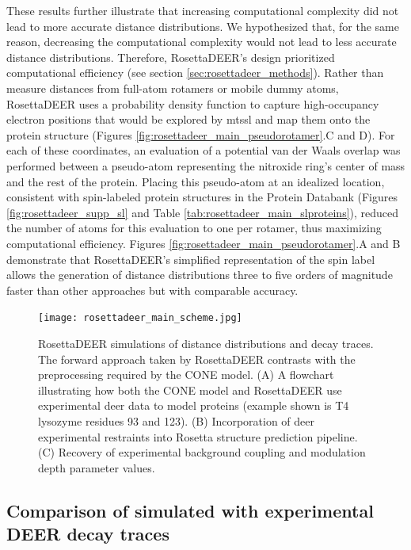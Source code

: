 These results further illustrate that increasing computational complexity did not lead to more accurate distance distributions. We hypothesized that, for the same reason, decreasing the computational complexity would not lead to less accurate distance distributions. Therefore, RosettaDEER’s design prioritized computational efficiency (see section \ref{sec:rosettadeer_methods}). Rather than measure distances from full-atom rotamers or mobile dummy atoms, RosettaDEER uses a probability density function to capture high-occupancy electron positions that would be explored by \gls{mtssl} and map them onto the protein structure (Figures \ref{fig:rosettadeer_main_pseudorotamer}.C and D). For each of these coordinates, an evaluation of a potential van der Waals overlap was performed between a pseudo-atom representing the nitroxide ring’s center of mass and the rest of the protein. Placing this pseudo-atom at an idealized location, consistent with spin-labeled protein structures in the Protein Databank (Figures \ref{fig:rosettadeer_supp_sl} and Table \ref{tab:rosettadeer_main_slproteins}), reduced the number of atoms for this evaluation to one per rotamer, thus maximizing computational efficiency. Figures \ref{fig:rosettadeer_main_pseudorotamer}.A and B demonstrate that RosettaDEER’s simplified representation of the spin label allows the generation of distance distributions three to five orders of magnitude faster than other approaches but with comparable accuracy.

\begin{figure}[h!]
\centering
\texttt{[image: rosettadeer\_main\_scheme.jpg]}
 \caption[RosettaDEER simulations of distance distributions and decay traces.]{RosettaDEER simulations of distance distributions and decay traces. The forward approach taken by RosettaDEER contrasts with the preprocessing required by the CONE model. (A) A flowchart illustrating how both the CONE model and RosettaDEER use experimental \gls{deer} data to model proteins (example shown is T4 lysozyme residues 93 and 123). (B) Incorporation of \gls{deer} experimental restraints into Rosetta structure prediction pipeline. (C) Recovery of experimental background coupling and modulation depth parameter values.}
\label{fig:rosettadeer_main_scheme}
\end{figure}

\subsection{Comparison of simulated with experimental DEER decay traces}


